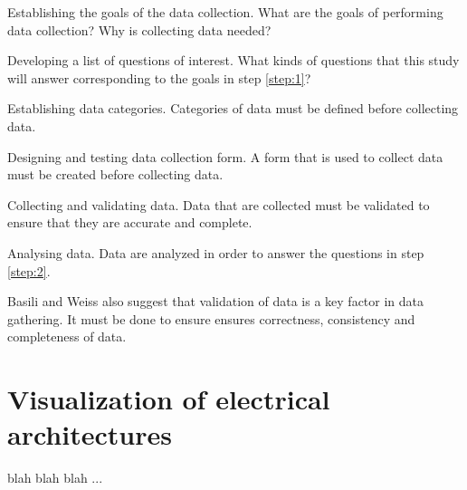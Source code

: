 \begin{step} \label{step:1}
Establishing the goals of the data collection. What are the goals of performing data collection? Why is collecting data needed?
\end{step}

\begin{step} \label{step:2}
Developing a list of questions of interest. What kinds of questions that this study will answer corresponding to the goals in step \ref{step:1}?
\end{step}

\begin{step} \label{step:3}
Establishing data categories. Categories of data must be defined before collecting data.
\end{step}

\begin{step} \label{step:4}
Designing and testing data collection form. A form that is used to collect data must be created before collecting data.
\end{step}

\begin{step} \label{step:5}
Collecting and validating data. Data that are collected must be validated to ensure that they are accurate and complete.
\end{step}

\begin{step} \label{step:6}
Analysing data. Data are analyzed in order to answer the questions in step \ref{step:2}.
\end{step}

Basili and Weiss also suggest that validation of data is a key factor in data gathering. It must be done to ensure ensures correctness, consistency and completeness of data.



\section{Visualization of electrical architectures}
blah blah blah ... \todo{[to be filled in]}
